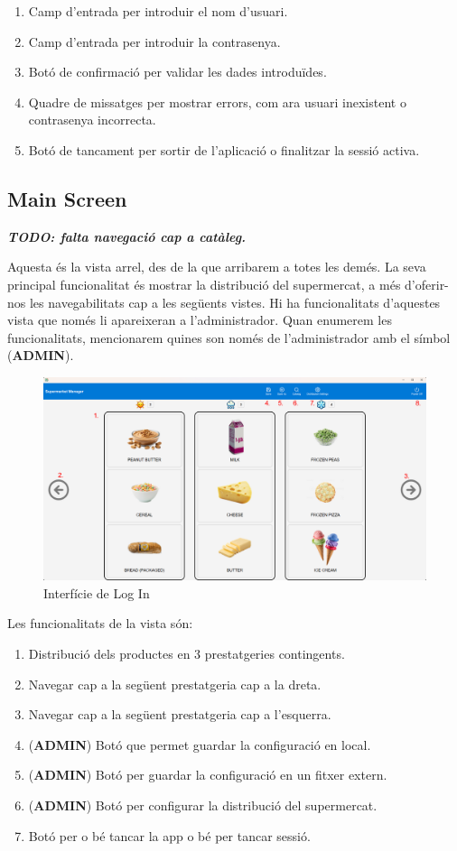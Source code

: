 \documentclass[a4paper,12pt]{article}
\begin{document}
	\begin{enumerate}
		\item Camp d'entrada per introduir el nom d'usuari.
		\item Camp d'entrada per introduir la contrasenya.
		\item Botó de confirmació per validar les dades introduïdes.
		\item Quadre de missatges per mostrar errors, com ara usuari inexistent o contrasenya incorrecta.
		\item Botó de tancament per sortir de l'aplicació o finalitzar la sessió activa.
	\end{enumerate}
	
	\newpage
	\subsection*{Main Screen}
	
	\textbf{\textit{TODO: falta navegació cap a catàleg.}}
	
	Aquesta és la vista arrel, des de la que arribarem a totes les demés. La seva principal funcionalitat és mostrar la distribució del supermercat, a més d'oferir-nos les navegabilitats cap a les següents vistes. Hi ha funcionalitats d'aquestes vista que només li apareixeran a l'administrador. Quan enumerem les funcionalitats, mencionarem quines son només de l'administrador amb el símbol (\textbf{ADMIN}).
	
	\begin{figure}[H] 
		\centering
		\includegraphics[width=0.75\linewidth]{assets/mainscreen.png}
		\caption{Interfície de Log In}
	\end{figure}
	
	\noindent Les funcionalitats de la vista són:
	
	\begin{enumerate}
		\item Distribució dels productes en 3 prestatgeries contingents.
		\item Navegar cap a la següent prestatgeria cap a la dreta.
		\item Navegar cap a la següent prestatgeria cap a l'esquerra.
		\item (\textbf{ADMIN}) Botó que permet guardar la configuració en local.
		\item (\textbf{ADMIN}) Botó per guardar la configuració en un fitxer extern.
		\item (\textbf{ADMIN}) Botó per configurar la distribució del supermercat.
		\item Botó per o bé tancar la app o bé per tancar sessió.
	\end{enumerate}
	
\end{document}
